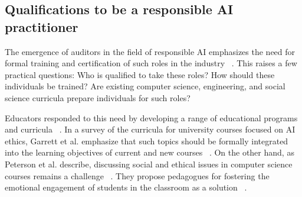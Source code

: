 \documentclass[sigconf]{acmart}
\begin{document}
 
  

\subsection{Qualifications to be a responsible AI practitioner}
The emergence of auditors in the field of responsible AI emphasizes the need for formal training and certification of such roles in the industry ~\cite{Costanza-Chock2022-ch}. This raises a few practical questions: Who is qualified to take these roles? How should these individuals be trained? Are existing computer science, engineering, and social science curricula prepare individuals for such roles? 

Educators responded to this need by developing a range of educational programs and curricula ~\cite{Gorur2020-vu,Williams2021-sd,Quinn2021-jj,Furey2019-xz,Borenstein2021}. 
In a survey of the curricula for university courses focused on AI ethics, Garrett et al. emphasize that such topics should be formally integrated into the learning objectives of current and new courses ~\cite{Garrett2020-dw}. On the other hand, as Peterson et al. describe, discussing social and ethical issues in computer science courses remains a challenge ~\cite{Peterson2023-xa}. They propose pedagogues for fostering the emotional engagement of students in the classroom as a solution ~\cite{Peterson2023-xa}. 
\end{document}
